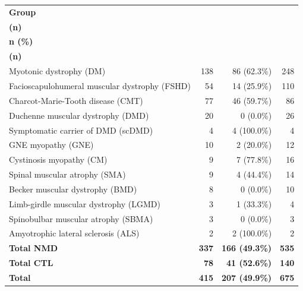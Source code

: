\documentclass[border=6pt]{standalone}
\begin{document}
\begin{tabular}{lrrr}
\toprule
\textbf{Group} & \makecell[r]{\textbf{Participants}\\\textbf{(n)}} & \makecell[r]{\textbf{Female}\\\textbf{n (\%)}} & \makecell[r]{\textbf{Visits}\\\textbf{(n)}} \\
\midrule
Myotonic dystrophy (DM) & 138 & 86 (62.3\%) & 248 \\
Facioscapulohumeral muscular dystrophy (FSHD) & 54 & 14 (25.9\%) & 110 \\
Charcot-Marie-Tooth disease (CMT) & 77 & 46 (59.7\%) & 86 \\
Duchenne muscular dystrophy (DMD) & 20 & 0 (0.0\%) & 26 \\
Symptomatic carrier of DMD (scDMD) & 4 & 4 (100.0\%) & 4 \\
GNE myopathy (GNE) & 10 & 2 (20.0\%) & 12 \\
Cystinosis myopathy (CM) & 9 & 7 (77.8\%) & 16 \\
Spinal muscular atrophy (SMA) & 9 & 4 (44.4\%) & 14 \\
Becker muscular dystrophy (BMD) & 8 & 0 (0.0\%) & 10 \\
Limb-girdle muscular dystrophy (LGMD) & 3 & 1 (33.3\%) & 4 \\
Spinobulbar muscular atrophy (SBMA) & 3 & 0 (0.0\%) & 3 \\
Amyotrophic lateral sclerosis (ALS) & 2 & 2 (100.0\%) & 2 \\
\midrule
\textbf{Total NMD} & \textbf{337} & \textbf{166 (49.3\%)} & \textbf{535} \\
\textbf{Total CTL} & \textbf{78} & \textbf{41 (52.6\%)} & \textbf{140} \\
\textbf{Total} & \textbf{415} & \textbf{207 (49.9\%)} & \textbf{675} \\
\bottomrule
\end{tabular}
\end{document}
